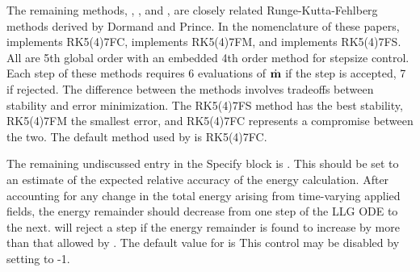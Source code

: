 \begin{description}
The remaining methods, ,  ,
and , are closely related Runge-Kutta-Fehlberg methods
derived by Dormand and Prince\cite{dormand1980,dormand1986}.  In the
nomenclature of these papers,
 implements RK5(4)7FC,
 implements RK5(4)7FM, and
 implements RK5(4)7FS.
All are 5th global order with an embedded 4th order method for stepsize
control.  Each step of these methods requires 6 evaluations of
$\dot{\textbf{m}}$ if the step is accepted, 7 if rejected.  The difference
between the methods involves tradeoffs between stability and error
minimization.  The RK5(4)7FS method has the best stability, RK5(4)7FM
the smallest error, and RK5(4)7FC represents a compromise between the
two.  The default method used by  is
RK5(4)7FC.

\label{html:oxsrkeprecision}
The remaining undiscussed entry in the 
Specify block is .  This should be set to an
estimate of the expected relative accuracy of the energy calculation.
After accounting for any change in the total energy arising from
time-varying applied fields, the energy remainder should decrease from
one step of the LLG ODE to the next.   will
reject a step if the energy remainder is found to increase by more than
that allowed by .  The default value for
 is   This control
may be disabled by setting  to -1.


\end{description}
